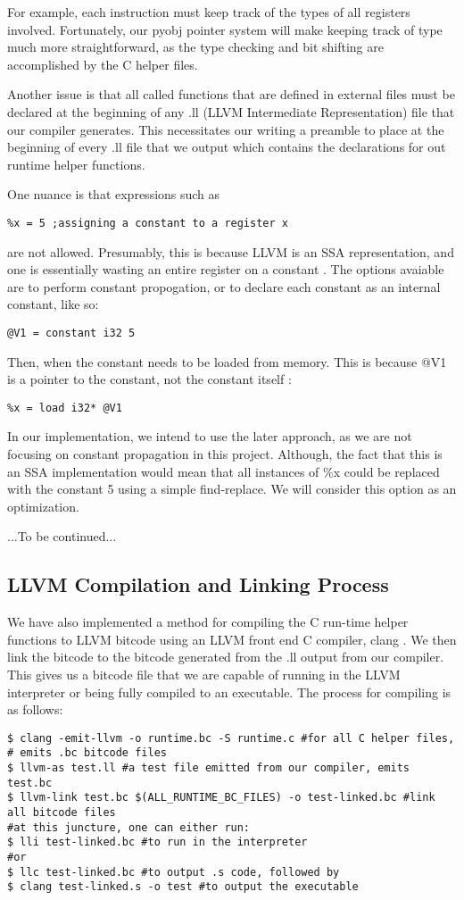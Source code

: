 \documentclass[11pt]{article}
\begin{document}
For example, each instruction must keep track of the types of all registers involved. Fortunately, our pyobj pointer system will make keeping track of type much more straightforward, as the type checking and bit shifting are accomplished by the C helper files.

Another issue is that all called functions that are defined in external files must be declared at the beginning of any .ll (LLVM Intermediate Representation) file that our compiler generates. This necessitates our writing a preamble to place at the beginning of every .ll file that we output which contains the declarations for out runtime helper functions.

One nuance is that expressions such as
\begin{verbatim}
%x = 5 ;assigning a constant to a register x
\end{verbatim} 
are not allowed. Presumably, this is because LLVM is an SSA representation, and one is essentially wasting an entire register on a constant \cite{llvm-discussions}. The options avaiable are to perform constant propogation, or to declare each constant as an internal constant, like so:
\begin{verbatim}
@V1 = constant i32 5
\end{verbatim}
Then, when the constant needs to be loaded from memory. This is because @V1 is a pointer to the constant, not the constant itself \cite{Regni}:
\begin{verbatim}
%x = load i32* @V1
\end{verbatim}

In our implementation, we intend to use the later approach, as we are not focusing on constant propagation in this project. Although, the fact that this is an SSA implementation would mean that all instances of \%x could be replaced with the constant 5 using a simple find-replace. We will consider this option as an optimization.

...To be continued...

\subsection{LLVM Compilation and Linking Process}
We have also implemented a method for compiling the C run-time helper functions to LLVM bitcode using an LLVM front end C compiler, clang \cite{clang.llvm.org}. We then link the bitcode to the bitcode generated from the .ll output from our compiler. This gives us a bitcode file that we are capable of running in the LLVM interpreter or being fully compiled to an executable.
The process for compiling is as follows:
\begin{verbatim}
$ clang -emit-llvm -o runtime.bc -S runtime.c #for all C helper files, 
# emits .bc bitcode files
$ llvm-as test.ll #a test file emitted from our compiler, emits test.bc
$ llvm-link test.bc $(ALL_RUNTIME_BC_FILES) -o test-linked.bc #link all bitcode files
#at this juncture, one can either run:
$ lli test-linked.bc #to run in the interpreter
#or
$ llc test-linked.bc #to output .s code, followed by
$ clang test-linked.s -o test #to output the executable
\end{verbatim}
\end{document}

